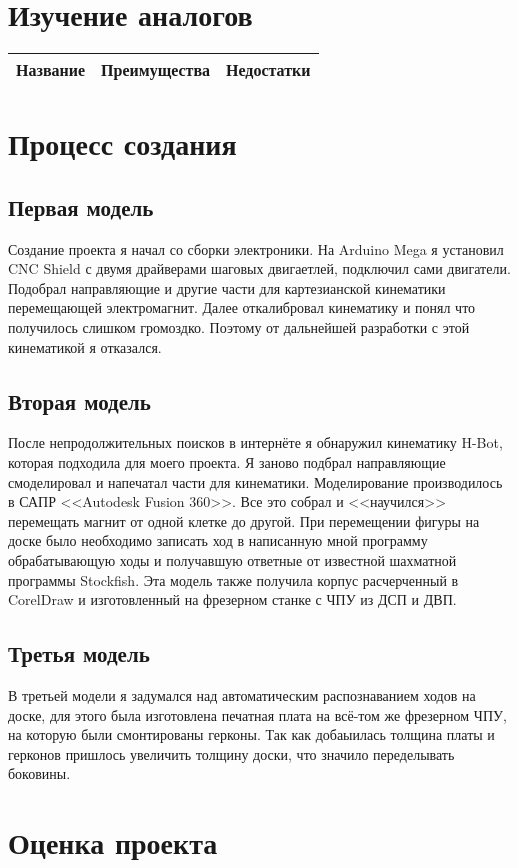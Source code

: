 \documentclass[a4paper]{article}
\begin{document}
  \section {Изучение аналогов}
  \begin{tabular}{|l|l|l|} \hline
    Название & Преимущества & Недостатки \\ \hline
  \end{tabular}

  \section{Процесс создания}
  \subsection{Первая модель}
  Создание проекта я начал со сборки электроники. На Arduino Mega я установил CNC Shield с двумя драйверами шаговых двигаетлей, подключил сами двигатели. Подобрал направляющие и другие части для картезианской кинематики перемещающей электромагнит. Далее откалибровал кинематику и понял что получилось слишком громоздко. Поэтому от дальнейшей разработки с этой кинематикой я отказался.
  \subsection{Вторая модель}
  После непродолжительных поисков в интернёте я обнаружил кинематику H-Bot, которая подходила для моего проекта. Я заново подбрал направляющие смоделировал и напечатал части для кинематики. Моделирование производилось в САПР <<Autodesk Fusion 360>>. Все это собрал и <<научился>> перемещать магнит от одной клетке до другой. При перемещении фигуры на доске было необходимо записать ход в написанную мной программу обрабатывающую ходы и получавшую ответные от известной шахматной программы Stockfish. Эта модель также получила корпус расчерченный в CorelDraw и изготовленный на фрезерном станке с ЧПУ из ДСП и ДВП.
  \subsection{Третья модель}
  В третьей модели я задумался над автоматическим распознаванием ходов на доске, для этого была изготовлена печатная плата на всё-том же фрезерном ЧПУ, на которую были смонтированы герконы. Так как добаыилась толщина платы и герконов пришлось увеличить толщину доски, что значило переделывать боковины.

  \section{Оценка проекта}
\end{document}
